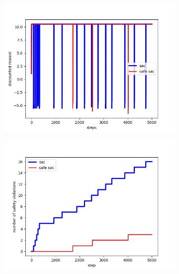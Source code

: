 \documentclass{article} %
\begin{document}
\begin{figure}[ht]
\centering
\begin{subfigure}[b]{0.45\textwidth}
\centering
\includegraphics[width=\textwidth]{fig5a_reward.png}
\caption{}
\label{fig:gull}
\end{subfigure}%
\begin{subfigure}[b]{0.45\textwidth}
\centering
\includegraphics[width=\textwidth]{fig5b_violation.png}
\caption{}
\label{fig:gull}
\end{subfigure}%


\end{figure}
\end{document}
